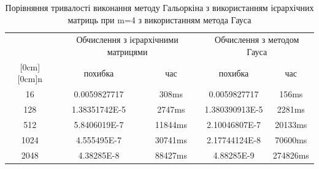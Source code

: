 \documentclass[12pt]{report}
\begin{document}
\begin{table}[ht]
	\centering 
	\begin{tabular}{|c| c| c| c| c|} %
		\hline%
		
	
		& \multicolumn{2}{c|}{Обчислення з ієрархічними матрицями} &\multicolumn{2}{c|}{Обчислення з методом Гауса } \\
		
		\raisebox{1.5ex}[0cm][0cm]{n}& похибка &час & похибка & час \\ [0.25ex] %
		\hline %
		16 & 0.0059827717& 308ms& 0.0059827717 & 156ms  \\ %
		128 & 1.38351742E-5& 2747ms & 1.380390913E-5&2281ms \\
		512 &5.8406019E-7 & 11844ms & 2.10046807E-7 &20133ms\\
		1024 & 4.555495E-7 &30741ms& 2.17744124E-8& 70600ms \\
		2048 & 4.38285E-8& 88427ms& 4.88285E-9 & 274826ms
		\\ [0.5ex] %
		\hline %
	\end{tabular}
	\caption{Порівняння тривалості виконання методу Гальоркіна з використанням ієрархічних матриць при m=4 з використанням метода Гауса}
	\label{table:nonlin} %
\end{table}
\end{document}
